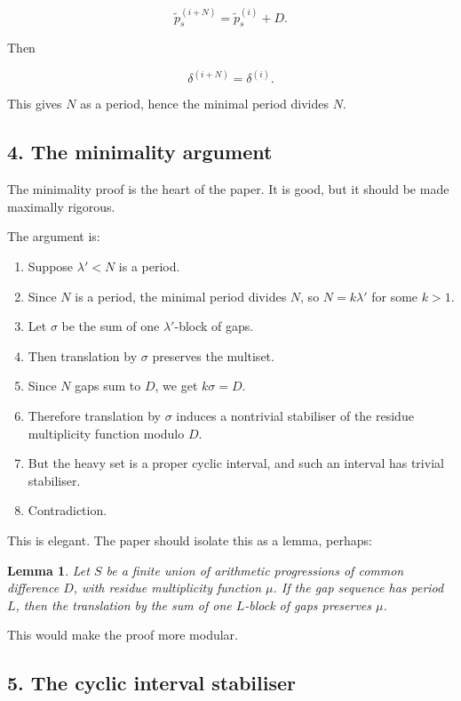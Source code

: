 \documentclass[11pt]{article}
\newtheorem{lemma}{Lemma}
\begin{document}
\[
\tilde p_s^{(i+N)} = \tilde p_s^{(i)} + D.
\]

Then

\[
\delta^{(i+N)}=\delta^{(i)}.
\]

This gives \(N\) as a period, hence the minimal period divides \(N\).

\subsection*{4. The minimality argument}

The minimality proof is the heart of the paper.  It is good, but it should be
made maximally rigorous.

The argument is:

\begin{enumerate}
    \item Suppose \(\lambda'<N\) is a period.
    \item Since \(N\) is a period, the minimal period divides \(N\), so
    \(N=k\lambda'\) for some \(k>1\).
    \item Let \(\sigma\) be the sum of one \(\lambda'\)-block of gaps.
    \item Then translation by \(\sigma\) preserves the multiset.
    \item Since \(N\) gaps sum to \(D\), we get \(k\sigma=D\).
    \item Therefore translation by \(\sigma\) induces a nontrivial
    stabiliser of the residue multiplicity function modulo \(D\).
    \item But the heavy set is a proper cyclic interval, and such an interval
    has trivial stabiliser.
    \item Contradiction.
\end{enumerate}

This is elegant.  The paper should isolate this as a lemma, perhaps:

\begin{lemma}
Let \(S\) be a finite union of arithmetic progressions of common difference
\(D\), with residue multiplicity function \(\mu\).  If the gap sequence has
period \(L\), then the translation by the sum of one \(L\)-block of gaps
preserves \(\mu\).
\end{lemma}

This would make the proof more modular.

\subsection*{5. The cyclic interval stabiliser}
\end{document}
